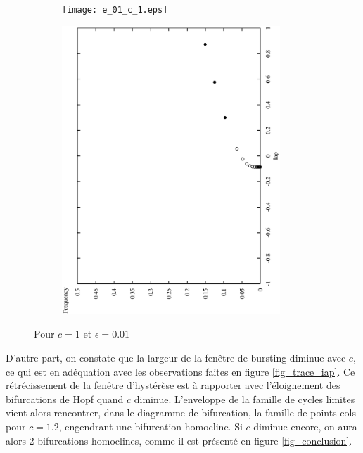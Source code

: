 \documentclass[12pt,a4paper,onecolumn]{article}
\begin{document}
\begin{figure}[htb]\ContinuedFloat
	\centering
	\begin{subfigure}[b]{\textwidth}
		\texttt{[image: e\_01\_c\_1.eps]}
	\end{subfigure}

	\begin{subfigure}[b]{\textwidth}
		\includegraphics[angle = 270, width = 0.9\textwidth]{freq_c_1.eps}
	\end{subfigure}
	\caption{Pour $c = 1$ et $\epsilon = 0.01$}
\label{fig_transition}
\end{figure}



D'autre part, on constate que la largeur de la fenêtre de bursting diminue avec $c$, ce qui est en adéquation avec les observations faites en figure \ref{fig_trace_iap}. Ce rétrécissement de la fenêtre d'hystérèse est à rapporter avec l'éloignement des bifurcations de Hopf quand $c$ diminue. L'enveloppe de la famille de cycles limites vient alors rencontrer, dans le diagramme de bifurcation, la famille de points cols pour $c=1.2$, engendrant une bifurcation homocline. Si $c$ diminue encore, on aura alors 2 bifurcations homoclines, comme il est présenté en figure \ref{fig_conclusion}.
\end{document}
